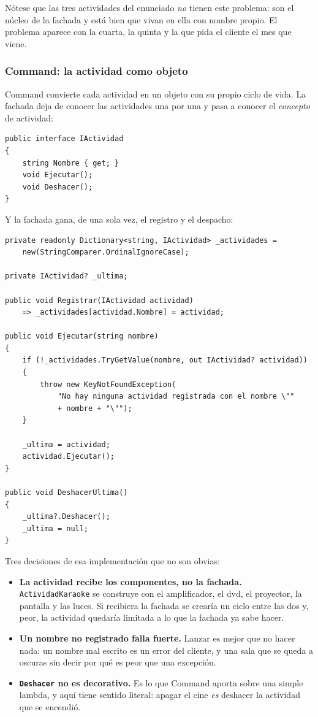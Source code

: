 Nótese que las tres actividades del enunciado \emph{no} tienen este problema: son el núcleo
de la fachada y está bien que vivan en ella con nombre propio. El problema aparece con la
cuarta, la quinta y la que pida el cliente el mes que viene.

\subsubsection*{Command: la actividad como objeto}

Command convierte cada actividad en un objeto con su propio ciclo de vida. La fachada deja de
conocer las actividades una por una y pasa a conocer el \emph{concepto} de actividad:

{\small
\begin{verbatim}
public interface IActividad
{
    string Nombre { get; }
    void Ejecutar();
    void Deshacer();
}
\end{verbatim}
}

Y la fachada gana, de una sola vez, el registro y el despacho:

{\small
\begin{verbatim}
private readonly Dictionary<string, IActividad> _actividades =
    new(StringComparer.OrdinalIgnoreCase);

private IActividad? _ultima;

public void Registrar(IActividad actividad)
    => _actividades[actividad.Nombre] = actividad;

public void Ejecutar(string nombre)
{
    if (!_actividades.TryGetValue(nombre, out IActividad? actividad))
    {
        throw new KeyNotFoundException(
            "No hay ninguna actividad registrada con el nombre \""
            + nombre + "\"");
    }

    _ultima = actividad;
    actividad.Ejecutar();
}

public void DeshacerUltima()
{
    _ultima?.Deshacer();
    _ultima = null;
}
\end{verbatim}
}

Tres decisiones de esa implementación que no son obvias:

\begin{itemize}[leftmargin=1.2cm]
    \item \textbf{La actividad recibe los componentes, no la fachada.}
          \texttt{ActividadKaraoke} se construye con el amplificador, el dvd, el proyector,
          la pantalla y las luces. Si recibiera la fachada se crearía un ciclo entre las dos
          y, peor, la actividad quedaría limitada a lo que la fachada ya sabe hacer.
    \item \textbf{Un nombre no registrado falla fuerte.} Lanzar es mejor que no hacer nada:
          un nombre mal escrito es un error del cliente, y una sala que se queda a oscuras
          sin decir por qué es peor que una excepción.
    \item \textbf{\texttt{Deshacer} no es decorativo.} Es lo que Command aporta sobre una
          simple lambda, y aquí tiene sentido literal: apagar el cine \emph{es} deshacer la
          actividad que se encendió.
\end{itemize}

